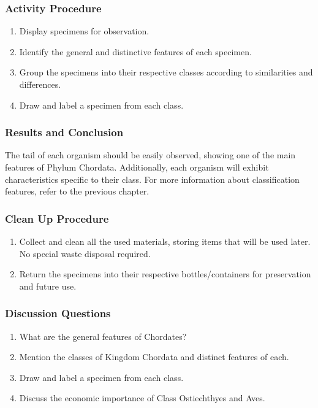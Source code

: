 \subsubsection*{Activity Procedure}
\begin{enumerate}
\item{Display specimens for observation.}
\item{Identify the general and distinctive features of each specimen.}
\item{Group the specimens into their respective classes according to similarities and differences.}
\item{Draw and label a specimen from each class.}
\end{enumerate}

\subsubsection*{Results and Conclusion}
The tail of each organism should be easily observed, showing one of the main features of Phylum Chordata. Additionally, each organism will exhibit characteristics specific to their class. For more information about classification features, refer to the previous chapter.

\subsubsection*{Clean Up Procedure}
\begin{enumerate}
\item{Collect and clean all the used materials, storing items that will be used later. No special waste disposal required.}
\item{Return the specimens into their respective bottles/containers for preservation and future use.}
\end{enumerate}

\subsubsection*{Discussion Questions}
\begin{enumerate}
\item{What are the general features of Chordates?}
\item{Mention the classes of Kingdom Chordata and distinct features of each.}
\item{Draw and label a specimen from each class.}
\item{Discuss the economic importance of Class Ostiechthyes and Aves.}
\end{enumerate}

